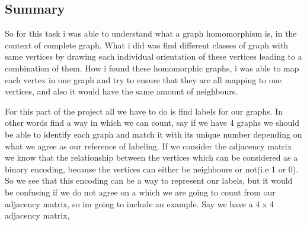 \documentclass{Assignment}
\begin{document}
\subsection*{Summary}
So for this task i was able to understand what a graph homomorphism is, in the context of complete graph. What i did was find different classes of graph with same vertices by drawing each individual orientation of these vertices leading to a combination of them. How i found these homomorphic graphs, i was able to map each vertex in one graph and try to ensure that they are all mapping to one vertices, and also it would have the same amount of neighbours.\newpage

For this part of the project all we have to do is find labels for our graphs. In other words find a way in which we can count, say if we have 4 graphs we should be able to identify each graph and match it with its unique number depending on what we agree as our reference of labeling. If we consider the adjacency matrix we know that the relationship between the vertices which can be considered as a binary encoding, because the vertices can either be neighbours or not(i.e 1 or 0).\\
So we see that this encoding can be a way to represent our labels, but it would be confusing if we do not agree on a which we are going to count from our adjacency matrix, so im going to include an example. Say we have a 4 x 4 adjacency matrix,
\end{document}
